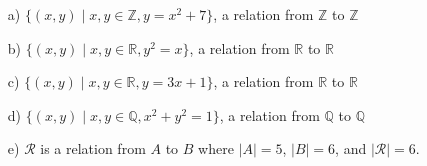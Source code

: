 \documentclass{article}
\begin{document}
\begin{enumerate}
    \item[a)] \( \{ (x, y) \mid x, y \in \mathbb{Z}, y = x^2 + 7 \} \), a relation from \(\mathbb{Z}\) to \(\mathbb{Z}\)
    \item[b)] \( \{ (x, y) \mid x, y \in \mathbb{R}, y^2 = x \} \), a relation from \(\mathbb{R}\) to \(\mathbb{R}\)
    \item[c)] \( \{ (x, y) \mid x, y \in \mathbb{R}, y = 3x + 1 \} \), a relation from \(\mathbb{R}\) to \(\mathbb{R}\)
    \item[d)] \( \{ (x, y) \mid x, y \in \mathbb{Q}, x^2 + y^2 = 1 \} \), a relation from \(\mathbb{Q}\) to \(\mathbb{Q}\)
    \item[e)] \( \mathcal{R} \) is a relation from \( A \) to \( B \) where \( |A| = 5 \), \( |B| = 6 \), and \( |\mathcal{R}| = 6 \).
\end{enumerate}
\newpage
\end{document}
